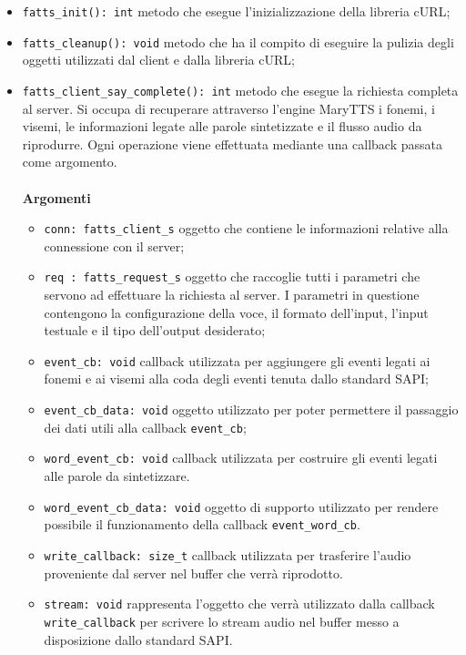 \begin{itemize}
	\item \texttt{fatts\_init(): int} metodo che esegue l'inizializzazione della libreria cURL;
	\item \texttt{fatts\_cleanup(): void} metodo che ha il compito di eseguire la pulizia degli oggetti utilizzati dal client e dalla libreria cURL;
	\item \texttt{fatts\_client\_say\_complete(): int} metodo che esegue la richiesta completa al server. Si occupa di recuperare attraverso l'engine MaryTTS i fonemi, i visemi, le informazioni legate alle parole sintetizzate e il flusso audio da riprodurre.
	Ogni operazione viene effettuata mediante una callback passata come argomento.
	\\\\
	\textbf{Argomenti}
	\begin{itemize}
		\item \texttt{conn: fatts\_client\_s} oggetto che contiene le informazioni relative alla connessione con il server;
		\item \texttt{req : fatts\_request\_s} oggetto che raccoglie tutti i parametri che servono ad effettuare la richiesta al server. I parametri in questione contengono la configurazione della voce, il formato dell'input, l'input testuale e il tipo dell'output desiderato;
		\item \texttt{event\_cb: void} callback utilizzata per aggiungere gli eventi legati ai fonemi e ai visemi alla coda degli eventi tenuta dallo standard SAPI;
		\item \texttt{event\_cb\_data: void} oggetto utilizzato per poter permettere il passaggio dei dati utili alla callback \texttt{event\_cb};
		\item \texttt{word\_event\_cb: void} callback utilizzata per costruire gli eventi legati alle parole da sintetizzare.
		\item \texttt{word\_event\_cb\_data: void} oggetto di supporto utilizzato per rendere possibile il funzionamento della callback \texttt{event\_word\_cb}.
		\item \texttt{write\_callback: size\_t} callback utilizzata per trasferire l'audio proveniente dal server nel buffer che verrà riprodotto.
		\item \texttt{stream: void} rappresenta l'oggetto che verrà utilizzato dalla callback \texttt{write\_callback} per scrivere lo stream audio nel buffer messo a disposizione dallo standard SAPI.
	\end{itemize}
\end{itemize}
